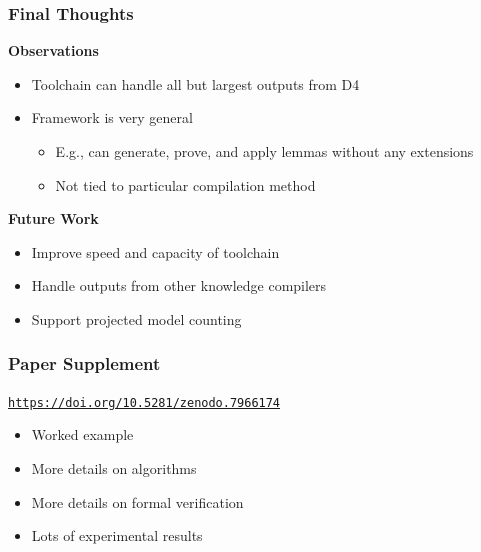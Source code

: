 \documentclass[t,pdf]{beamer}
\newcommand{\cref}[2]{\href{#1}{\color{blue}#2}}
\newcommand{\hcref}[1]{\cref{#1}{\small\tt #1}}
\newcommand{\bitem}{\item[$\bullet$]}
\begin{document}
\begin{frame}
  \frametitle{Final Thoughts}

  \medskip

  {\bf Observations}
  \begin{itemize}
  \item Toolchain can handle all but largest outputs from D4
  \item Framework is very general
    \begin{itemize}
      \bitem E.g., can generate, prove, and apply lemmas without any extensions
      \bitem Not tied to particular compilation method
    \end{itemize}
  \end{itemize}

  \medskip

  {\bf Future Work}
  \begin{itemize}
  \item Improve speed and capacity of toolchain
  \item Handle outputs from other knowledge compilers
  \item Support projected model counting
  \end{itemize}

\end{frame}

\begin{frame}
\frametitle{Paper Supplement}

\bigskip
\begin{center}
 \hcref{https://doi.org/10.5281/zenodo.7966174}
\end{center}

\bigskip
\begin{itemize}
\item Worked example
\item More details on algorithms
\item More details on formal verification
\item Lots of experimental results
\end{itemize}

\end{frame}
\end{document}
